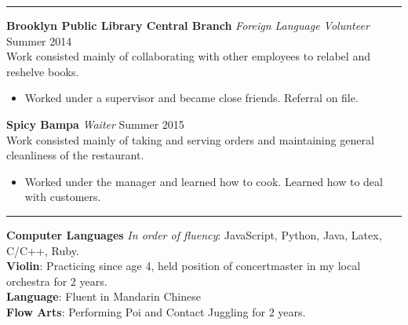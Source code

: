 \documentclass[14, .75in]{article}
\begin{document}
  \vspace{0.1cm} \hrule \vspace{0.2cm}
  \noindent\textbf{Brooklyn Public Library Central Branch}\textit{ Foreign Language Volunteer}
  \hfill Summer 2014\\
  Work consisted mainly of collaborating with other employees to relabel and reshelve books.
  \begin{itemize}[label={--},noitemsep, topsep=0pt]
    \item Worked under a supervisor and became close friends. Referral on file.
  \end{itemize}
  \noindent\textbf{Spicy Bampa}\textit{ Waiter }
  \hfill Summer 2015\\
  Work consisted mainly of taking and serving orders and maintaining general cleanliness of the restaurant.
  \begin{itemize}[label={--},noitemsep, topsep=0pt]
    \item Worked under the manager and learned how to cook. Learned how to deal with customers.
  \end{itemize}



  \vspace{0.1cm} \hrule \vspace{0.2cm}
  \noindent\textbf{Computer Languages}\textit{ In order of fluency}:
  JavaScript, Python, Java, Latex, C/C++, Ruby.\\
  \textbf{Violin}: Practicing since age 4, held position of concertmaster in my local orchestra for 2 years.\\
  \noindent\textbf{Language}: Fluent in Mandarin Chinese\\
  \textbf{Flow Arts}: Performing Poi and Contact Juggling for 2 years.\\
\end{document}
